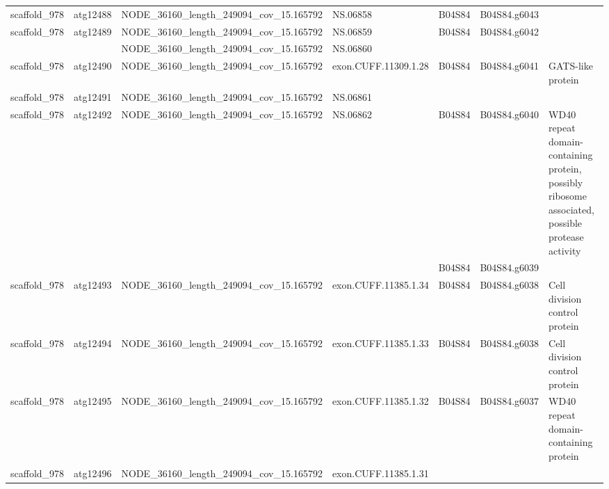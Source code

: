 \begin{longtable}{lllllll}
   scaffold\_978 &  atg12488 &  NODE\_36160\_length\_249094\_cov\_15.165792 &              NS.06858 &       B04S84 &  B04S84.g6043 &                                                                                                  \\
   scaffold\_978 &  atg12489 &  NODE\_36160\_length\_249094\_cov\_15.165792 &              NS.06859 &       B04S84 &  B04S84.g6042 &                                                                                                  \\
                &           &  NODE\_36160\_length\_249094\_cov\_15.165792 &              NS.06860 &              &               &                                                                                                   \\
   scaffold\_978 &  atg12490 &  NODE\_36160\_length\_249094\_cov\_15.165792 &  exon.CUFF.11309.1.28 &       B04S84 &  B04S84.g6041 &                                                                                GATS-like protein \\
   scaffold\_978 &  atg12491 &  NODE\_36160\_length\_249094\_cov\_15.165792 &              NS.06861 &              &               &                                                                                                  \\
   scaffold\_978 &  atg12492 &  NODE\_36160\_length\_249094\_cov\_15.165792 &              NS.06862 &       B04S84 &  B04S84.g6040 &  WD40 repeat domain-containing protein, possibly ribosome associated, possible protease activity \\
                &           &                                         &                       &       B04S84 &  B04S84.g6039 &                                                                                                  &     \\
   scaffold\_978 &  atg12493 &  NODE\_36160\_length\_249094\_cov\_15.165792 &  exon.CUFF.11385.1.34 &       B04S84 &  B04S84.g6038 &                                                                    Cell division control protein \\
   scaffold\_978 &  atg12494 &  NODE\_36160\_length\_249094\_cov\_15.165792 &  exon.CUFF.11385.1.33 &       B04S84 &  B04S84.g6038 &                                                                    Cell division control protein \\
   scaffold\_978 &  atg12495 &  NODE\_36160\_length\_249094\_cov\_15.165792 &  exon.CUFF.11385.1.32 &       B04S84 &  B04S84.g6037 &                                                            WD40 repeat domain-containing protein \\
   scaffold\_978 &  atg12496 &  NODE\_36160\_length\_249094\_cov\_15.165792 &  exon.CUFF.11385.1.31 &              &               &                                                                                                  \\
\end{longtable}

